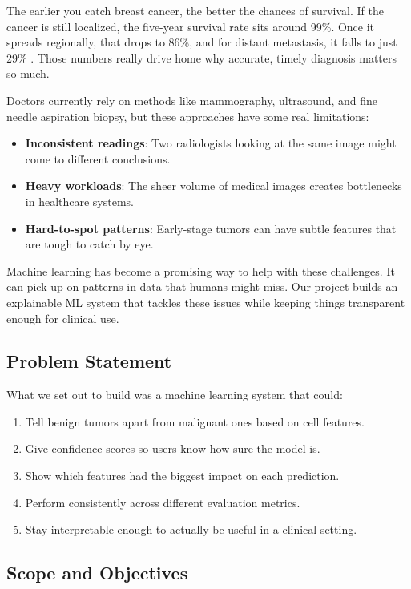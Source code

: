 \documentclass[12pt]{article}
\begin{document}
The earlier you catch breast cancer, the better the chances of survival. If the cancer is still localized, the five-year survival rate sits around 99\%. Once it spreads regionally, that drops to 86\%, and for distant metastasis, it falls to just 29\% \cite{acs2023}. Those numbers really drive home why accurate, timely diagnosis matters so much.

Doctors currently rely on methods like mammography, ultrasound, and fine needle aspiration biopsy, but these approaches have some real limitations:

\begin{itemize}
    \item \textbf{Inconsistent readings}: Two radiologists looking at the same image might come to different conclusions.
    \item \textbf{Heavy workloads}: The sheer volume of medical images creates bottlenecks in healthcare systems.
    \item \textbf{Hard-to-spot patterns}: Early-stage tumors can have subtle features that are tough to catch by eye.
\end{itemize}

Machine learning has become a promising way to help with these challenges. It can pick up on patterns in data that humans might miss. Our project builds an explainable ML system that tackles these issues while keeping things transparent enough for clinical use.

\subsection{Problem Statement}

What we set out to build was a machine learning system that could:

\begin{enumerate}
    \item Tell benign tumors apart from malignant ones based on cell features.
    \item Give confidence scores so users know how sure the model is.
    \item Show which features had the biggest impact on each prediction.
    \item Perform consistently across different evaluation metrics.
    \item Stay interpretable enough to actually be useful in a clinical setting.
\end{enumerate}

\subsection{Scope and Objectives}
\end{document}
